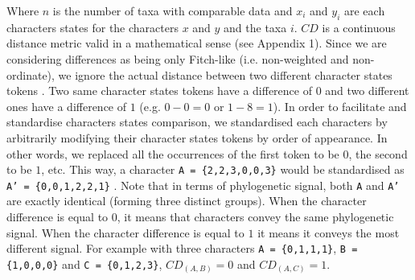 \documentclass[12pt,letterpaper]{article}
\begin{document}
\noindent Where $n$ is the number of taxa with comparable data and $x_i$ and $y_i$ are each characters states for the characters $x$ and $y$ and the taxa $i$.
$CD$ is a continuous distance metric valid in a mathematical sense (see Appendix 1).
Since we are considering differences as being only Fitch-like (i.e. non-weighted and non-ordinate), we ignore the actual distance between two different character states tokens \citep[i.e. a Gower distance;][]{GowerDist}.
Two same character states tokens have a difference of $0$ and two different ones have a difference of $1$ (e.g. $0 - 0 = 0$ or $1 - 8 = 1$).
In order to facilitate and standardise characters states comparison, we standardised each characters by arbitrarily modifying their character states tokens by order of appearance.
In other words, we replaced all the occurrences of the first token to be $0$, the second to be $1$, etc.
This way, a character \texttt{A = \{2,2,3,0,0,3\}} would be standardised as \texttt{A' = \{0,0,1,2,2,1\}} \citep[following the \textit{xyz} notation in][p.13]{felsenstein2004inferring}.
Note that in terms of phylogenetic signal, both \texttt{A} and \texttt{A'} are exactly identical (forming three distinct groups).
When the character difference is equal to $0$, it means that characters convey the same phylogenetic signal.
When the character difference is equal to $1$ it means it conveys the most different signal.
For example with three characters \texttt{A = \{0,1,1,1\}}, \texttt{B = \{1,0,0,0\}} and \texttt{C = \{0,1,2,3\}}, $CD_{(A,B)} = 0$ and $CD_{(A,C)} = 1$.
\end{document}
